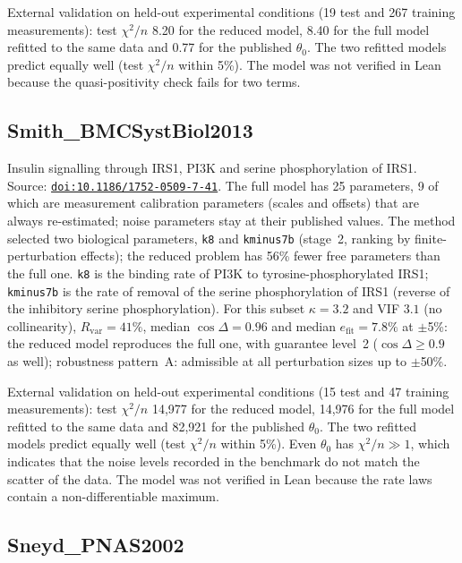 External validation on held-out experimental conditions (19 test and 267 training measurements): test $\chi^2/n$ 8.20 for the reduced model, 8.40 for the full model refitted to the same data and 0.77 for the published $\theta_0$. The two refitted models predict equally well (test $\chi^2/n$ within 5\%). The model was not verified in Lean because the quasi-positivity check fails for two terms.

\subsection*{Smith\_BMCSystBiol2013}

Insulin signalling through IRS1, PI3K and serine phosphorylation of IRS1. Source: \href{https://doi.org/10.1186/1752-0509-7-41}{\nolinkurl{doi:10.1186/1752-0509-7-41}}. The full model has 25 parameters, 9 of which are measurement calibration parameters (scales and offsets) that are always re-estimated; noise parameters stay at their published values. The method selected two biological parameters, \texttt{k8} and \texttt{kminus7b} (stage~2, ranking by finite-perturbation effects); the reduced problem has 56\% fewer free parameters than the full one. \texttt{k8} is the binding rate of PI3K to tyrosine-phosphorylated IRS1; \texttt{kminus7b} is the rate of removal of the serine phosphorylation of IRS1 (reverse of the inhibitory serine phosphorylation). For this subset $\kappa=3.2$ and VIF $3.1$ (no collinearity), $R_{\mathrm{var}}=41\%$, median $\cos\Delta=0.96$ and median $e_{\mathrm{fit}}=7.8\%$ at $\pm$5\%: the reduced model reproduces the full one, with guarantee level~2 ($\cos\Delta\ge0.9$ as well); robustness pattern~A: admissible at all perturbation sizes up to $\pm$50\%.

External validation on held-out experimental conditions (15 test and 47 training measurements): test $\chi^2/n$ 14,977 for the reduced model, 14,976 for the full model refitted to the same data and 82,921 for the published $\theta_0$. The two refitted models predict equally well (test $\chi^2/n$ within 5\%). Even $\theta_0$ has $\chi^2/n\gg1$, which indicates that the noise levels recorded in the benchmark do not match the scatter of the data. The model was not verified in Lean because the rate laws contain a non-differentiable maximum.

\subsection*{Sneyd\_PNAS2002}

